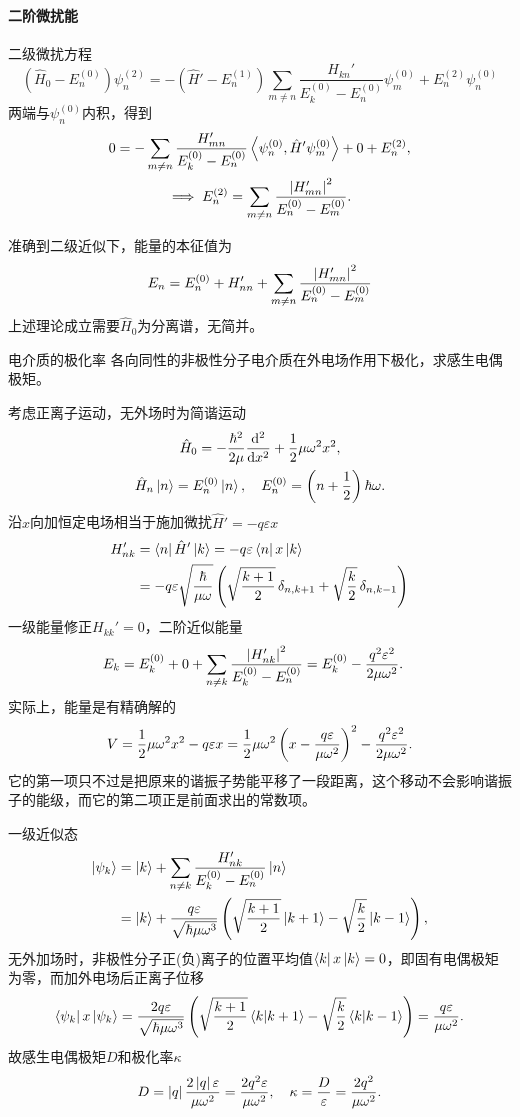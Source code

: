 \paragraph{二阶微扰能}二级微扰方程
\[
	(\hat H_0-E_n^{(0)})\psi_n^{(2)}=-(\hat H'-E_n^{(1)})\sum_{m\neq n}\frac{H_{kn}'}{E_k^{(0)}-E_n^{(0)}}\psi_m^{(0)}+E_n^{(2)}\psi_n^{(0)}
\]
两端与$\psi_n^{(0)}$内积，得到
\begin{gather}\notag
	0=-\sum_{m\neq n}\frac{H_{mn}'}{E_k^{(0)}-E_n^{(0)}}\inp{\psi_n^{(0)}}{\hat H'\psi_m^{(0)}}+0+E_n^{(2)},\\
	\implies E_n^{(2)}=\sum_{m\neq n}\frac{\abs{H_{mn}'}^2}{E_n^{(0)}-E_m^{(0)}}.
\end{gather}

准确到二级近似下，能量的本征值为
\begin{align}
	E_n=E_n^{(0)}+H_{nn}'+\sum_{m\neq n}\frac{\abs{H_{mn}'}^2}{E_n^{(0)}-E_m^{(0)}}
\end{align}
上述理论成立需要$\hat H_0$为分离谱，无简并。
\begin{example}{电介质的极化率}{}
	各向同性的非极性分子电介质在外电场作用下极化，求感生电偶极矩。

	考虑正离子运动，无外场时为简谐运动
	\begin{gather*}
		\hat H_0=-\frac{\hbar^2}{2\mu}\dd[2]x+\frac12\mu\omega^2x^2,\\
		\hat H_n\ket n=E_n^{(0)}\ket n,\quad E_n^{(0)}=\kh{n+\frac12}\hbar\omega.
	\end{gather*}
	沿$x$向加恒定电场相当于施加微扰$\hat H'=-q\varepsilon x$
	\begin{align*}
		H_{nk}'&=\bra n\hat H'\ket k=-q\varepsilon\bra nx\ket k\\
		&=-q\varepsilon\sqrt{\frac\hbar{\mu\omega}}\kh{\sqrt{\frac{k+1}2}\vd_{n,k+1}+\sqrt{\frac k2}\vd_{n,k-1}}
	\end{align*}
	一级能量修正$H_{kk}'=0$，二阶近似能量
	\begin{align*}
		E_k&=E_k^{(0)}+0+\sum_{n\neq k}\frac{\abs{H_{nk}'}^2}{E_k^{(0)}-E_n^{(0)}}=E_k^{(0)}-\frac{q^2\varepsilon^2}{2\mu\omega^2}.
	\end{align*}
	实际上，能量是有精确解的
	\[
V=\frac12\mu\omega^2x^2-q\varepsilon x=\frac12\mu\omega^2\kh{x-\frac{q\varepsilon}{\mu\omega^2}}^2-\frac{q^2\varepsilon^2}{2\mu\omega^2}.
\]
	它的第一项只不过是把原来的谐振子势能平移了一段距离，这个移动不会影响谐振子的能级，而它的第二项正是前面求出的常数项。

	一级近似态
	\begin{align*}
		\ket{\psi_k}&=\ket k+\sum_{n\neq k}\frac{H_{nk}'}{E_k^{(0)}-E_n^{(0)}}\ket n\\
		&=\ket k+\frac{q\varepsilon}{\sqrt{\hbar\mu\omega^3}}\kh{\sqrt{\frac{k+1}2}\ket{k+1}-\sqrt{\frac k2}\ket{k-1}},
	\end{align*}
	无外加场时，非极性分子正(负)离子的位置平均值$\bra kx\ket k=0$，即固有电偶极矩为零，而加外电场后正离子位移
	\[
		\bra{\psi_k}x\ket{\psi_k}=\frac{2q\varepsilon}{\sqrt{\hbar\mu\omega^3}}\kh{\sqrt{\frac{k+1}2}\brkt k{k+1}-\sqrt{\frac k2}\brkt k{k-1}}=\frac{q\varepsilon}{\mu\omega^2}.
\]
	故感生电偶极矩$D$和极化率$\kappa$
	\[
D=\abs q\frac{2\abs q\varepsilon}{\mu\omega^2}=\frac{2q^2\varepsilon}{\mu\omega^2},\quad \kappa=\frac D\varepsilon=\frac{2q^2}{\mu\omega^2}.
\]
\end{example}

